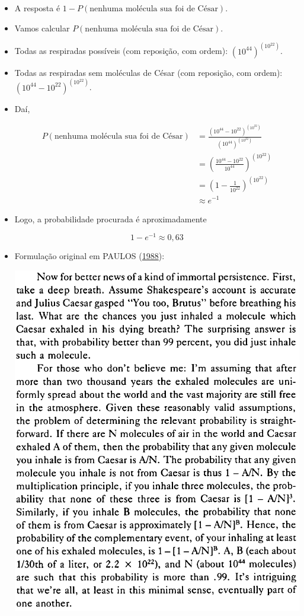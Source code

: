 \documentclass[
  11pt]{report}
\begin{document}
\begin{itemize}
\item
  A resposta é $1 - P(\text{nenhuma molécula sua foi de César})$.
\item
  Vamos calcular $P(\text{nenhuma molécula sua foi de César})$.
\item
  Todas as respiradas possíveis (com reposição, com ordem): $\left( 10^{44} \right)^{\left(10^{22} \right)}$.
\item
  Todas as respiradas sem moléculas de César (com reposição, com ordem): $\left( 10^{44} - 10^{22} \right)^{\left(10^{22} \right)}$.
\item
  Daí,

  \[
  \begin{aligned}
  P(\text{nenhuma molécula sua foi de César}) 
  &=
  \frac{\left( 10^{44} - 10^{22} \right)^{\left(10^{22} \right)}}
  {\left( 10^{44} \right)^{\left(10^{22} \right)}}
  \\
  &= 
  \left( \frac{10^{44} - 10^{22}}{10^{44}} \right)^{(10^{22})}
  \\
  &=
  \left( 1 - \frac{1}{10^{22}} \right)^{(10^{{22}})}
  \\
  &\approx e^{-1}
  \end{aligned}
  \]
\item
  Logo, a probabilidade procurada é aproximadamente

  \[
  1 - e^{-1} \approx 0{,}63
  \]
\item
  Formulação original em PAULOS (\protect\hyperlink{ref-paulos-1988-innum}{1988}):

  \begin{center}\includegraphics[width=0.6\linewidth]{images/caesar} \end{center}
\end{itemize}
\end{document}
